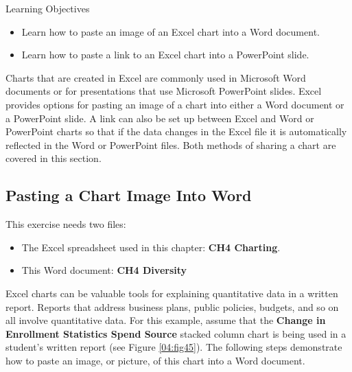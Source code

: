 \begin{center}
	\begin{objbox}{Learning Objectives}
		\begin{itemize}
			\setlength{\itemsep}{0pt}
			\setlength{\parskip}{0pt}
			\setlength{\parsep}{0pt}

			\item Learn how to paste an image of an Excel chart into a Word document.
			\item Learn how to paste a link to an Excel chart into a PowerPoint slide.
			
		\end{itemize}
	\end{objbox}
\end{center}

Charts that are created in Excel are commonly used in Microsoft Word documents or for presentations that use Microsoft PowerPoint slides. Excel provides options for pasting an image of a chart into either a Word document or a PowerPoint slide. A link can also be set up between Excel and Word or PowerPoint charts so that if the data changes in the Excel file it is automatically reflected in the Word or PowerPoint files. Both methods of sharing a chart are covered in this section.

\subsection{Pasting a Chart Image Into Word}

This exercise needs two files:

\begin{itemize}
	\item The Excel spreadsheet used in this chapter: \textbf{CH4 Charting}.
	\item This Word document: \textbf{CH4 Diversity}
\end{itemize}

Excel charts can be valuable tools for explaining quantitative data in a written report. Reports that address business plans, public policies, budgets, and so on all involve quantitative data. For this example, assume that the \textbf{Change in Enrollment Statistics Spend Source} stacked column chart is being used in a student's written report (see Figure \ref{04:fig45}). The following steps demonstrate how to paste an image, or picture, of this chart into a Word document.

